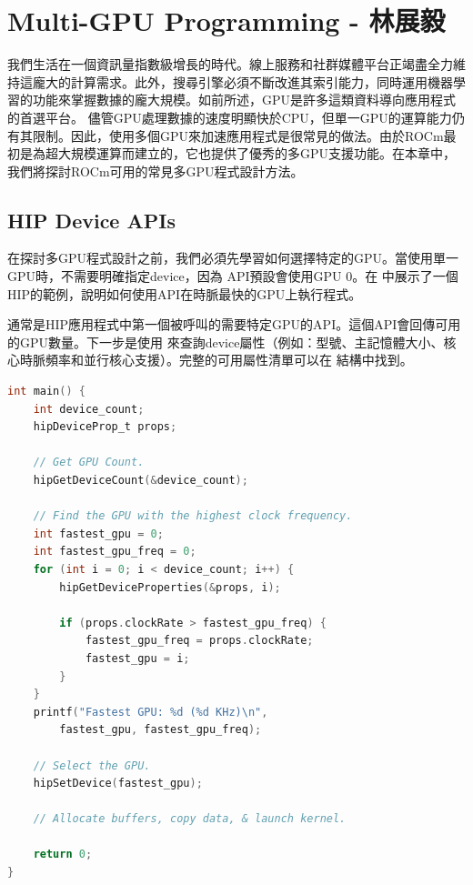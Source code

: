 \chapter{Multi-GPU Programming - 林展毅}


我們生活在一個資訊量指數級增長的時代。線上服務和社群媒體平台正竭盡全力維持這龐大的計算需求。此外，搜尋引擎必須不斷改進其索引能力，同時運用機器學習的功能來掌握數據的龐大規模。如前所述，GPU是許多這類資料導向應用程式的首選平台。
儘管GPU處理數據的速度明顯快於CPU，但單一GPU的運算能力仍有其限制。因此，使用多個GPU來加速應用程式是很常見的做法。由於ROCm最初是為超大規模運算而建立的，它也提供了優秀的多GPU支援功能。在本章中，我們將探討ROCm可用的常見多GPU程式設計方法。 

\section{HIP Device APIs}

在探討多GPU程式設計之前，我們必須先學習如何選擇特定的GPU。當使用單一GPU時，不需要明確指定device，因為 API預設會使用GPU 0。在 中展示了一個HIP的範例，說明如何使用API在時脈最快的GPU上執行程式。

 通常是HIP應用程式中第一個被呼叫的需要特定GPU的API。這個API會回傳可用的GPU數量。下一步是使用 來查詢device屬性（例如：型號、主記憶體大小、核心時脈頻率和並行核心支援）。完整的可用屬性清單可以在 結構中找到。

\begin{lstlisting}[language=C, caption={用時脈最快的GPU執行程式}, captionpos=t, label={lst:hip_device_example}]
int main() {
    int device_count;
    hipDeviceProp_t props;

    // Get GPU Count.
    hipGetDeviceCount(&device_count);

    // Find the GPU with the highest clock frequency.
    int fastest_gpu = 0;
    int fastest_gpu_freq = 0;
    for (int i = 0; i < device_count; i++) {
        hipGetDeviceProperties(&props, i);

        if (props.clockRate > fastest_gpu_freq) {
            fastest_gpu_freq = props.clockRate;
            fastest_gpu = i;
        }
    }
    printf("Fastest GPU: %d (%d KHz)\n",
        fastest_gpu, fastest_gpu_freq);

    // Select the GPU.
    hipSetDevice(fastest_gpu);

    // Allocate buffers, copy data, & launch kernel.

    return 0;
}
\end{lstlisting}

